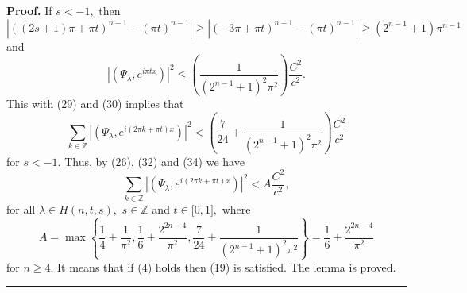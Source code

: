 \documentclass[10pt,a4paper]{amsart}
\newenvironment{proof}[1][Proof]{\textbf{#1.} }{\ \rule{0.5em}{0.5em}}
\begin{document}
\begin{proof}
If $s<-1,$ then
\[
\left\vert ((2s+1)\pi+\pi t)^{n-1}-(\pi t)^{n-1}\right\vert \geq\left\vert
(-3\pi+\pi t)^{n-1}-(\pi t)^{n-1}\right\vert \geq(2^{n-1}+1)\pi^{n-1}%
\]
and \
\begin{equation}
\left\vert \left(  \Psi_{\lambda},e^{i\pi tx}\right)  \right\vert ^{2}%
\leq\left(  \frac{1}{(2^{n-1}+1)^{2}\pi^{2}}\right)  \frac{C^{2}}{c^{2}}.
\tag{33}%
\end{equation}
This with (29) and (30) implies that
\begin{equation}
\sum_{k\in\mathbb{Z}}\left\vert \left(  \Psi_{\lambda},e^{i\left(  2\pi k+\pi
t\right)  x}\right)  \right\vert ^{2}<\left(  \frac{7}{24}+\frac{1}%
{(2^{n-1}+1)^{2}\pi^{2}}\right)  \frac{C^{2}}{c^{2}} \tag{34}%
\end{equation}
for $s<-1.$ Thus, by (26), (32) and (34) we have
\[
\sum_{k\in\mathbb{Z}}\left\vert \left(  \Psi_{\lambda},e^{i\left(  2\pi k+\pi
t\right)  x}\right)  \right\vert ^{2}<A\frac{C^{2}}{c^{2}},
\]
for all $\lambda\in H(n,t,s),$ $s\in\mathbb{Z}$ and $t\in\lbrack0,1],$ where
\[
A=\max\left\{  \frac{1}{4}+\frac{1}{\pi^{2}},\frac{1}{6}+\frac{2^{2n-4}}%
{\pi^{2}},\frac{7}{24}+\frac{1}{(2^{n-1}+1)^{2}\pi^{2}}\right\}  =\frac{1}%
{6}+\frac{2^{2n-4}}{\pi^{2}}%
\]
for $n\geq4.$ It means that if (4) holds then (19) is satisfied. The lemma is proved.
\end{proof}
\end{document}
